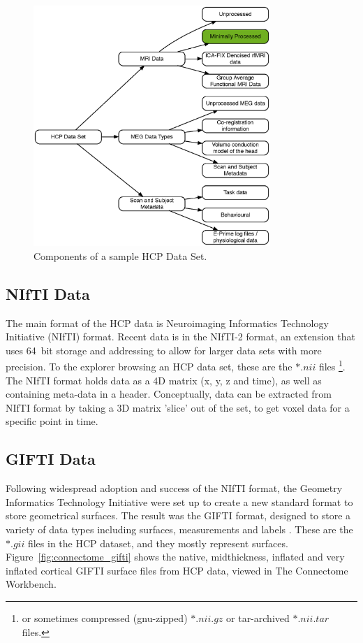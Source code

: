 \documentclass[MSc,paper=a4,pagesize=auto]{icldt}
\begin{document}
\begin{figure}[htbp!]
    \centering
    \includegraphics[width=0.8\textwidth]{resources/hcp_full_data_set}
    \caption{Components of a sample HCP Data Set.}
    \label{fig:hcp_full_data_set}
\end{figure}

\subsection{NIfTI Data}
The main format of the HCP data is Neuroimaging Informatics Technology Initiative (NIfTI) format. Recent data is in the NIfTI-2 format, an extension that uses \SI{64}{bit} storage and addressing to allow for larger data sets with more precision. To the explorer browsing an HCP data set, these are the $\ast.nii$ files \footnote{or sometimes compressed (gnu-zipped) $\ast.nii.gz$ or tar-archived $\ast.nii.tar$ files.}. The NIfTI format holds data as a 4D matrix (x, y, z and time), as well as containing meta-data in a header. Conceptually, data can be extracted from NIfTI format by taking a 3D matrix 'slice' out of the set, to get voxel data for a specific point in time. 

\subsection{GIFTI Data}
Following widespread adoption and success of the NIfTI format, the Geometry Informatics Technology Initiative were set up to create a new standard format to store geometrical surfaces. The result was the GIFTI format, designed to store a variety of data types including surfaces, measurements and labels \cite{Harwell2011}. These are the $\ast.gii$ files in the HCP dataset, and they mostly represent surfaces. Figure~\ref{fig:connectome_gifti} shows the native, midthickness, inflated and very inflated cortical GIFTI surface files from HCP data, viewed in The Connectome Workbench.
\end{document}
